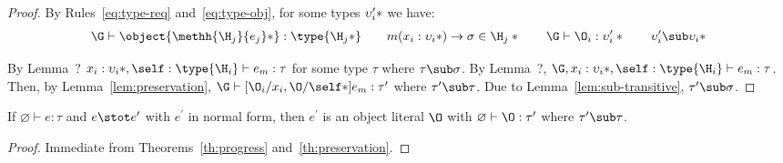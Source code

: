 \begin{theorem}[Preservation]
\begin{proof}
    \noindent By Rules~\ref{eq:type-req} and~\ref{eq:type-obj}, for some types
    $\*\upsilon^\prime_i*$ we have:
%
    \begin{displaymath}
      \G \vdash \object{\*\methh{\H_j}{e_j}*} : \type{\*\H_j*} \quad\quad
      m(\*x_i : \upsilon_i*) \to \sigma \in \*\H_j* \quad\quad
      \G \vdash \*\O_i : \upsilon^\prime_i* \quad\quad
      \*\upsilon^\prime_i \sub \upsilon_i*
    \end{displaymath}

    \noindent By Lemma~? $\*x_i : \upsilon_i*, \self : \type{\H_i} \vdash e_m :
    \tau$ for some type $\tau$ where $\tau \sub \sigma$.  By Lemma~?, $\G, \*x_i
    : \upsilon_i*, \self : \type{\H_i} \vdash e_m : \tau$.  Then, by
    Lemma~\ref{lem:preservation}, $\G \vdash [\*\O_i/x_i,\O/\self*]e_m :
    \tau^\prime$ where $\tau^\prime \sub \tau$.  Due to
    Lemma~\ref{lem:sub-transitive}, $\tau^\prime \sub \sigma$.
  \end{proof}

\end{theorem}

\begin{theorem}\label{th:type-soundness}
  If $\varnothing \vdash e : \tau$ and $e \stot e^\prime$ with $e^\prime$ in
  normal form, then $e^\prime$ is an object literal $\O$ with $\varnothing
  \vdash \O : \tau^\prime$ where $\tau^\prime \sub \tau$.

  \begin{proof}
    Immediate from Theorems~\ref{th:progress} and~\ref{th:preservation}.
  \end{proof}
\end{theorem}

